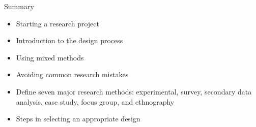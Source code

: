 \begin{center}
	\begin{tkawybox}{Summary}
		\begin{itemize}
			\setlength{\itemsep}{0pt}
			\setlength{\parskip}{0pt}
			\setlength{\parsep}{0pt}
			
			\item Starting a research project
			\item Introduction to the design process
			\item Using mixed methods
			\item Avoiding common research mistakes
			\item Define seven major research methods: experimental, survey, secondary data analysis, case study, focus group, and ethnography
			\item Steps in selecting an appropriate design
		\end{itemize}
	\end{tkawybox}
\end{center}

